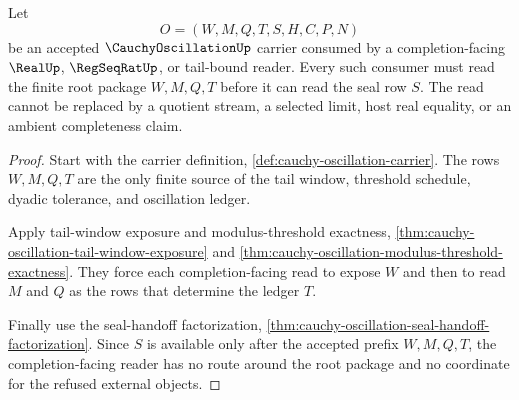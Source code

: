 \begin{theorem}
\label{thm:cauchy-oscillation-root-window-lock}
Let
$$
O=(W,M,Q,T,S,H,C,P,N)
$$
be an accepted $\CauchyOscillationUp$ carrier consumed by a completion-facing $\RealUp$, $\RegSeqRatUp$, or tail-bound reader. Every such consumer must read the finite root package $W,M,Q,T$ before it can read the seal row $S$. The read cannot be replaced by a quotient stream, a selected limit, host real equality, or an ambient completeness claim.
\end{theorem}
\begin{proof}
Start with the carrier definition, \autoref{def:cauchy-oscillation-carrier}. The rows $W,M,Q,T$ are the only finite source of the tail window, threshold schedule, dyadic tolerance, and oscillation ledger.

Apply tail-window exposure and modulus-threshold exactness, \autoref{thm:cauchy-oscillation-tail-window-exposure} and \autoref{thm:cauchy-oscillation-modulus-threshold-exactness}. They force each completion-facing read to expose $W$ and then to read $M$ and $Q$ as the rows that determine the ledger $T$.

Finally use the seal-handoff factorization, \autoref{thm:cauchy-oscillation-seal-handoff-factorization}. Since $S$ is available only after the accepted prefix $W,M,Q,T$, the completion-facing reader has no route around the root package and no coordinate for the refused external objects.
\end{proof}

